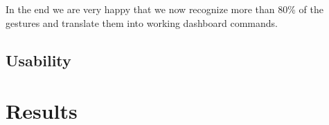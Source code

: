 In the end we are very happy that we now recognize more than 80\% of the gestures and translate them into working dashboard commands.


\section{Usability}
\label{ch:Results:sec:Usability}


\chapter{Results}
\label{ch:Results}

